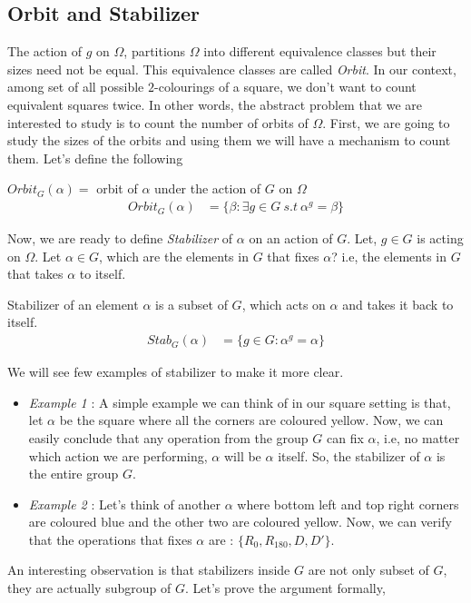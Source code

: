 {\subsection{Orbit and Stabilizer}
The action of $g$ on $\Omega$, partitions $\Omega$ into different equivalence classes but their sizes need not be equal. This equivalence classes are called \emph{Orbit}. In our context, among set of all possible $2$-colourings of a square, we don't want to count equivalent squares twice. In other words, the abstract problem that we are interested to study is to count the number of orbits of $\Omega$. First, we are going to study the sizes of the orbits and using them we will have a mechanism to count them. Let's define the following
\begin{definition}
$Orbit_G(\alpha)=$ orbit of $\alpha$ under the action of $G$ on $\Omega$
\begin{align*}
Orbit_G(\alpha)&=\{\beta:\exists g\in G \ s.t \ \alpha^g=\beta \}
\end{align*}
\end{definition}
Now, we are ready to define \emph{Stabilizer} of $\alpha$ on an action of $G$. Let, $g\in G$ is acting on $\Omega$. Let $\alpha\in G$, which are  the elements in $G$ that fixes $\alpha$? i.e, the elements in $G$ that takes $\alpha$ to itself. 
\begin{definition}
Stabilizer of an element $\alpha$ is a subset of $G$, which acts on $\alpha$ and takes it back to itself.
\begin{align*}
Stab_G(\alpha)&=\{g\in G: \alpha^g=\alpha \}
\end{align*}
\end{definition}
We will see few examples of stabilizer to make it more clear. 
\begin{itemize}
\item \emph{Example 1} : A simple example we can think of in our square setting is that, let $\alpha$ be the square where all the corners are coloured yellow. Now, we can easily conclude that any operation from the group $G$ can fix $\alpha$, i.e, no matter which action we are performing, $\alpha$ will be $\alpha$ itself. So, the stabilizer of $\alpha$ is the entire group $G$.
\item \emph{Example 2} : Let's think of another $\alpha$ where bottom left and top right corners are coloured blue and the other two are coloured yellow. Now, we can verify that the operations that fixes $\alpha$ are : $\{R_0,R_{180},D,D' \} $. 
\end{itemize}
An interesting observation is that stabilizers inside $G$ are not only subset of $G$, they are actually subgroup of $G$. Let's prove the argument formally,
}
